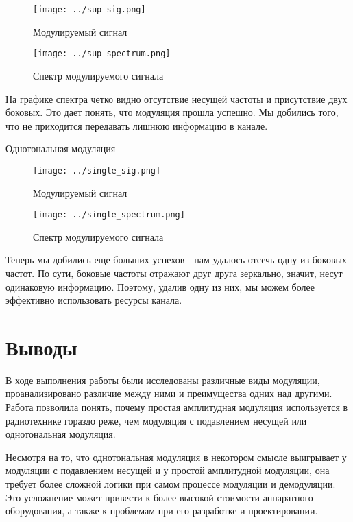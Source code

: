 	\begin{figure}[H]
		\begin{center}
			\texttt{[image: ../sup\_sig.png]}
			\caption{Модулируемый сигнал} 
		\end{center}
	\end{figure}
	
	\begin{figure}[H]
		\begin{center}
			\texttt{[image: ../sup\_spectrum.png]}
			\caption{Спектр модулируемого сигнала} 
		\end{center}
	\end{figure}

	На графике спектра четко видно отсутствие несущей частоты и присутствие двух боковых. Это дает понять, что модуляция прошла успешно. Мы добились того, что не приходится передавать лишнюю информацию в канале.
	
	\newpage
	\begin{center}
		\large{Однотональная модуляция}
	\end{center}
	
	\begin{figure}[H]
		\begin{center}
			\texttt{[image: ../single\_sig.png]}
			\caption{Модулируемый сигнал} 
		\end{center}
	\end{figure}
	
	\begin{figure}[H]
		\begin{center}
			\texttt{[image: ../single\_spectrum.png]}
			\caption{Спектр модулируемого сигнала} 
		\end{center}
	\end{figure}
	
	Теперь мы добились еще больших успехов - нам удалось отсечь одну из боковых частот. По сути, боковые частоты отражают друг друга зеркально, значит, несут одинаковую информацию. Поэтому, удалив одну из них, мы можем более эффективно использовать ресурсы канала.
	
	\newpage
	\section{Выводы}
	В ходе выполнения работы были исследованы различные виды модуляции, проанализировано различие между ними и преимущества одних над другими. Работа позволила понять, почему простая амплитудная модуляция используется в радиотехнике гораздо реже, чем модуляция с подавлением несущей или однотональная модуляция.
	\par
	Несмотря на то, что однотональная модуляция в некотором смысле выигрывает у модуляции с подавлением несущей и у простой амплитудной модуляции, она требует более сложной логики при самом процессе модуляции и демодуляции. Это усложнение может привести к более высокой стоимости аппаратного оборудования, а также к проблемам при его разработке и проектировании.
